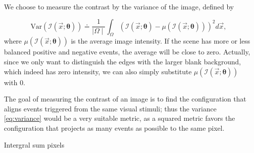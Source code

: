 We choose to measure the contrast by the variance of the image,
defined by

\begin{equation}
  \label{eq:variance}
  \mathrm{Var}\left(\mathcal{I}\left(\vec{x};\bm{\theta}\right)\right)\doteq\frac{1}{\mid\Omega\mid}\int_{\Omega}\left(\mathcal{I}\left(\vec{x};\bm{\theta}\right)-\mu\left(\mathcal{I}\left(\vec{x};\bm{\theta}\right)\right)\right)^2d\vec{x},
\end{equation}
where $\mu\left(\mathcal{I}\left(\vec{x};\bm{\theta}\right)\right)$ is
the average image intensity. If the scene has more or less balanced
positive and negative events, the average will be close to
zero. Actually, since we only want to distinguish the edges with the
larger blank background, which indeed has zero intensity, we can also
simply substitute
$\mu\left(\mathcal{I}\left(\vec{x};\bm{\theta}\right)\right)$ with 0.

The goal of measuring the contrast of an image is to find the
configuration that aligns events triggered from the same visual
stimuli; thus the variance \cref{eq:variance} would be a very suitable
metric, as a squared metric favors the configuration that projects as
many events as possible to the same pixel.

Intergral sum pixels

